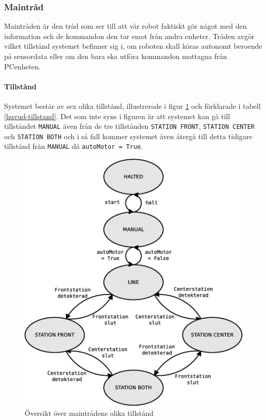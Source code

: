 \subsubsection{Maintråd}
Maintråden är den tråd som ser till att vår robot faktiskt gör något med den information och de kommandon den tar emot från andra enheter. Tråden avgör vilket tillstånd systemet befinner sig i, om roboten skall köras autonomt beroende på sensordata eller om den bara ska utföra kommandon mottagna från PCenheten.

\paragraph{Tillstånd}

Systemet består av sex olika tillstånd, illustrerade i figur \ref{huvud-tillstand-diagram} och förklarade i tabell \ref{huvud-tillstand}. Det som inte syns i figuren är att systemet kan gå till tillståndet \texttt{MANUAL} även från de tre tillstånden \texttt{STATION FRONT}, \texttt{STATION CENTER} och \texttt{STATION BOTH} och i så fall kommer systemet även återgå till detta tidigare tillstånd från \texttt{MANUAL} då \texttt{autoMotor = True}.

\begin{figure}[h!]
	\centering
	\includegraphics[scale=0.4]{grafik/huvud-tillstand}
	\caption{Översikt över maintrådens olika tillstånd} \label{huvud-tillstand-diagram}
\end{figure}

